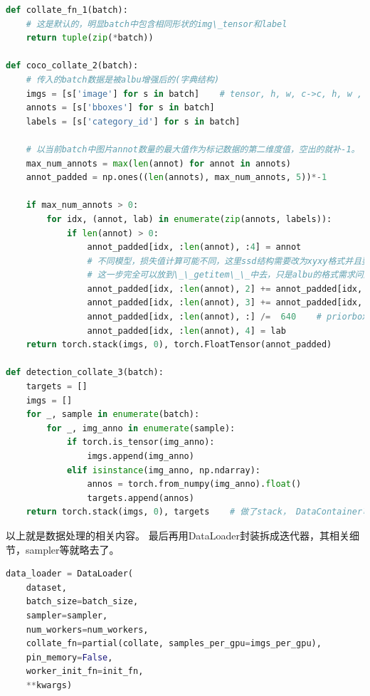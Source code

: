 \documentclass[UTF8]{ctexart}
\begin{document}
\lstset{style=mystyle}
\begin{lstlisting}[language=Python]
def collate_fn_1(batch):
	# 这是默认的，明显batch中包含相同形状的img\_tensor和label
	return tuple(zip(*batch))
	
def coco_collate_2(batch):
	# 传入的batch数据是被albu增强后的(字典结构)
    imgs = [s['image'] for s in batch]    # tensor, h, w, c->c, h, w , handle at transform in __getitem__
    annots = [s['bboxes'] for s in batch]
    labels = [s['category_id'] for s in batch]

	# 以当前batch中图片annot数量的最大值作为标记数据的第二维度值，空出的就补-1。
    max_num_annots = max(len(annot) for annot in annots)
    annot_padded = np.ones((len(annots), max_num_annots, 5))*-1

    if max_num_annots > 0:
        for idx, (annot, lab) in enumerate(zip(annots, labels)):
            if len(annot) > 0:
                annot_padded[idx, :len(annot), :4] = annot
				# 不同模型，损失值计算可能不同，这里ssd结构需要改为xyxy格式并且要做尺度归一化
				# 这一步完全可以放到\_\_getitem\_\_中去，只是albu的格式需求问题。
                annot_padded[idx, :len(annot), 2] += annot_padded[idx, :len(annot), 0]    #  xywh-->x1,y1,x2,y2 for general box,ssd target assigner
                annot_padded[idx, :len(annot), 3] += annot_padded[idx, :len(annot), 1]    # contains padded -1 label
                annot_padded[idx, :len(annot), :] /=  640    # priorbox for ssd primary target assinger
                annot_padded[idx, :len(annot), 4] = lab
	return torch.stack(imgs, 0), torch.FloatTensor(annot_padded)
	
def detection_collate_3(batch):
    targets = []
    imgs = []
    for _, sample in enumerate(batch):
        for _, img_anno in enumerate(sample):
            if torch.is_tensor(img_anno):
                imgs.append(img_anno)
            elif isinstance(img_anno, np.ndarray):
                annos = torch.from_numpy(img_anno).float()
                targets.append(annos)
    return torch.stack(imgs, 0), targets    # 做了stack， DataContainer可以不做stack
\end{lstlisting}

以上就是数据处理的相关内容。
最后再用DataLoader封装拆成迭代器，其相关细节，sampler等就略去了。
\lstset{style=mystyle}
\begin{lstlisting}[language=Python]
data_loader = DataLoader(
	dataset,
	batch_size=batch_size,
	sampler=sampler,
	num_workers=num_workers,
	collate_fn=partial(collate, samples_per_gpu=imgs_per_gpu),
	pin_memory=False,
	worker_init_fn=init_fn,
	**kwargs)
\end{lstlisting}
\end{document}
